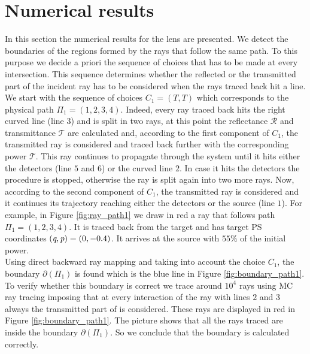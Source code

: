 \section{Numerical results}
In this section the numerical results for the lens are presented. We detect the boundaries of the regions formed by the rays that follow the same path. To this purpose we decide a priori the sequence of choices that has to be made at every intersection. This sequence determines whether the reflected or the transmitted part of the incident ray has to be considered when the rays traced back hit a line.\\ \indent
We start with the sequence of choices $C_1 = (T,T)$ which corresponds to the physical path $\Pi_1=(1,2,3,4)$.
Indeed, every ray traced back hits the right curved line (line $3$) and is split in two rays, at this point the reflectance $\mathcal{R}$ and transmittance $\mathcal{T}$ are calculated and, according to the first component of $C_1$, the transmitted ray is considered and traced back further with the corresponding power $\mathcal{T}$. This ray continues to propagate through the system until it hits either the detectors (line $5$ and $6$) or the curved line $2$.
In case it hits the detectors the procedure is stopped, otherwise the ray is split again into two more rays. Now, according to the second component of $C_1$, the transmitted ray is considered and it continues its trajectory reaching either the detectors or the source (line $1$). For example, in Figure \ref{fig:ray_path1} we draw in red a ray that follows path $\Pi_1 = (1,2,3,4)$. It is traced back from the target and has target PS coordinates $(\textit{q}, \textit{p})=(0, -0.4)$. It arrives at the source with $55\%$ of the initial power.\\ \indent 
Using direct backward ray mapping and taking into account the choice $C_1$, the boundary $\partial$$(\Pi_1)$ is found which is the blue line in Figure \ref{fig:boundary_path1}. To verify whether this boundary is correct we trace around $10^4$ rays using MC ray tracing imposing that at every interaction of the ray with lines $2$ and $3$ always the transmitted part of is considered. These rays are displayed in red in Figure \ref{fig:boundary_path1}. The picture shows that all the rays traced are inside the boundary $\partial$$(\Pi_1)$. So we conclude that the boundary is calculated correctly.
